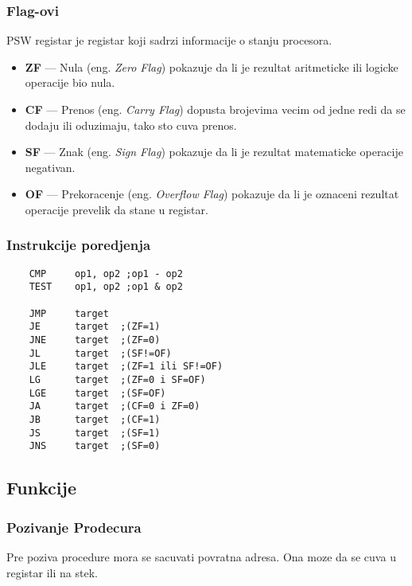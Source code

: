 \documentclass[12p,a4paper]{article}
\begin{document}
\begin{multicols}{2}
    \subsubsection{Flag-ovi}

    PSW registar je registar koji sadrzi informacije o stanju procesora.
    \begin{itemize}
        \itemsep0em
        \item \textbf{ZF} --- Nula (eng. \emph{Zero Flag}) pokazuje da li je
            rezultat aritmeticke ili logicke operacije bio nula.
        \item \textbf{CF} --- Prenos (eng. \emph{Carry Flag}) dopusta
            brojevima vecim od jedne redi da se dodaju ili oduzimaju, tako sto
            cuva prenos.
        \item \textbf{SF} --- Znak (eng. \emph{Sign Flag}) pokazuje da li je
            rezultat matematicke operacije negativan.
        \item \textbf{OF} --- Prekoracenje (eng. \emph{Overflow Flag}) pokazuje
            da li je oznaceni rezultat operacije prevelik da stane u registar.
    \end{itemize}
    
    \subsubsection{Instrukcije poredjenja}

    \begin{lstlisting}
    CMP     op1, op2 ;op1 - op2
    TEST    op1, op2 ;op1 & op2

    JMP     target  
    JE      target  ;(ZF=1)
    JNE     target  ;(ZF=0)
    JL      target  ;(SF!=OF)
    JLE     target  ;(ZF=1 ili SF!=OF)
    LG      target  ;(ZF=0 i SF=OF)
    LGE     target  ;(SF=OF)
    JA      target  ;(CF=0 i ZF=0)
    JB      target  ;(CF=1)
    JS      target  ;(SF=1)
    JNS     target  ;(SF=0)
    \end{lstlisting}
    
    \subsection{Funkcije}

    \subsubsection{Pozivanje Prodecura}
    
    Pre poziva procedure mora se sacuvati povratna adresa. Ona moze da se cuva
    u registar ili na stek.


\end{multicols}
\end{document}
